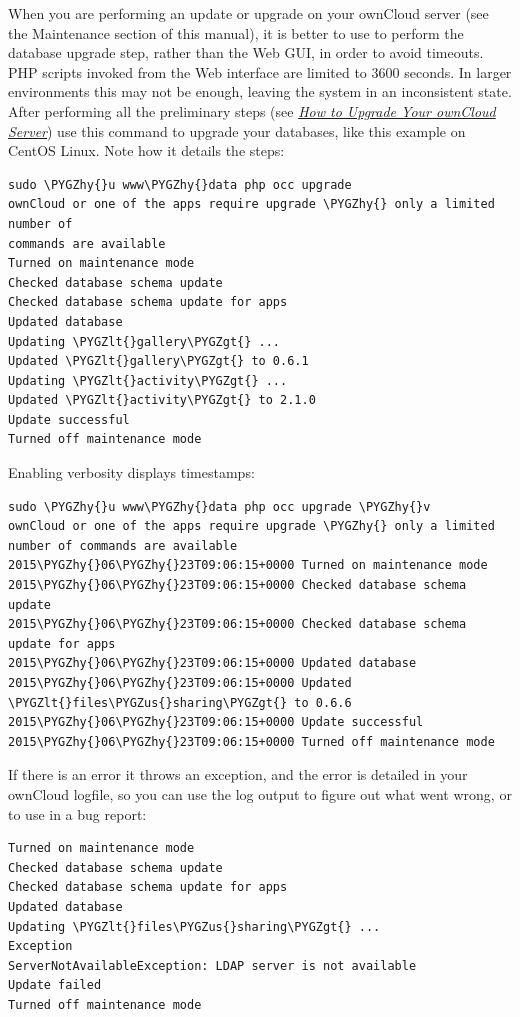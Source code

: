 \documentclass[letterpaper,10pt,english]{sphinxmanual}
\def\PYGZus{\char`\_}
\def\PYGZlt{\char`\<}
\def\PYGZgt{\char`\>}
\def\PYGZhy{\char`\-}
\begin{document}
When you are performing an update or upgrade on your ownCloud server (see the
Maintenance section of this manual), it is better to use  to perform the
database upgrade step, rather than the Web GUI, in order to avoid timeouts. PHP
scripts invoked from the Web interface are limited to 3600 seconds. In larger
environments this may not be enough, leaving the system in an inconsistent
state. After performing all the preliminary steps (see
{\hyperref[maintenance/upgrade::doc]{\emph{\emph{How to Upgrade Your ownCloud Server}}}}) use this command to upgrade your databases,
like this example on CentOS Linux. Note how it details the steps:

\begin{Verbatim}[commandchars=\\\{\}]
sudo \PYGZhy{}u www\PYGZhy{}data php occ upgrade
ownCloud or one of the apps require upgrade \PYGZhy{} only a limited number of
commands are available
Turned on maintenance mode
Checked database schema update
Checked database schema update for apps
Updated database
Updating \PYGZlt{}gallery\PYGZgt{} ...
Updated \PYGZlt{}gallery\PYGZgt{} to 0.6.1
Updating \PYGZlt{}activity\PYGZgt{} ...
Updated \PYGZlt{}activity\PYGZgt{} to 2.1.0
Update successful
Turned off maintenance mode
\end{Verbatim}

Enabling verbosity displays timestamps:

\begin{Verbatim}[commandchars=\\\{\}]
sudo \PYGZhy{}u www\PYGZhy{}data php occ upgrade \PYGZhy{}v
ownCloud or one of the apps require upgrade \PYGZhy{} only a limited number of commands are available
2015\PYGZhy{}06\PYGZhy{}23T09:06:15+0000 Turned on maintenance mode
2015\PYGZhy{}06\PYGZhy{}23T09:06:15+0000 Checked database schema update
2015\PYGZhy{}06\PYGZhy{}23T09:06:15+0000 Checked database schema update for apps
2015\PYGZhy{}06\PYGZhy{}23T09:06:15+0000 Updated database
2015\PYGZhy{}06\PYGZhy{}23T09:06:15+0000 Updated \PYGZlt{}files\PYGZus{}sharing\PYGZgt{} to 0.6.6
2015\PYGZhy{}06\PYGZhy{}23T09:06:15+0000 Update successful
2015\PYGZhy{}06\PYGZhy{}23T09:06:15+0000 Turned off maintenance mode
\end{Verbatim}

If there is an error it throws an exception, and the error is detailed in your
ownCloud logfile, so you can use the log output to figure out what went wrong,
or to use in a bug report:

\begin{Verbatim}[commandchars=\\\{\}]
Turned on maintenance mode
Checked database schema update
Checked database schema update for apps
Updated database
Updating \PYGZlt{}files\PYGZus{}sharing\PYGZgt{} ...
Exception
ServerNotAvailableException: LDAP server is not available
Update failed
Turned off maintenance mode
\end{Verbatim}
\end{document}
